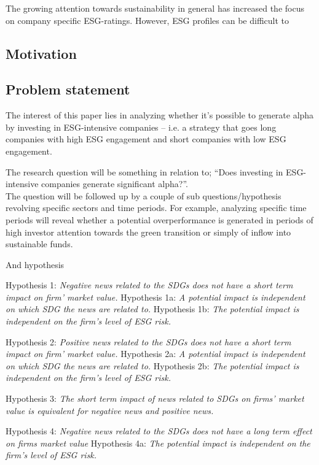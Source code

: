 The growing attention towards sustainability in general has increased the focus on company specific ESG-ratings. However, ESG profiles can be difficult to


\subsection{Motivation}

\subsection{Problem statement}

The interest of this paper lies in analyzing whether it’s possible to generate alpha by investing in ESG-intensive companies – i.e.
a strategy that goes long companies with high ESG engagement and short companies with low ESG engagement. 

The research question will be something in relation to; “Does investing in ESG-intensive companies generate significant alpha?”. \\

The question will be followed up by a couple of sub questions/hypothesis revolving specific sectors and time periods. For example, analyzing specific time periods will reveal whether a potential overperformance is generated in periods of high investor attention towards the green transition or simply of inflow into sustainable funds. 

And hypothesis

Hypothesis 1: \textit{Negative news related to the SDGs does not have a short term impact on firm' market value.
}
Hypothesis 1a: \textit{A potential impact is independent on which SDG the news are related to.}  
Hypothesis 1b: \textit{The potential impact is independent on the firm's level of ESG risk.}

Hypothesis 2: \textit{Positive news related to the SDGs does not have a short term impact on firm' market value.}
Hypothesis 2a: \textit{A potential impact is independent on which SDG the news are related to.}  
Hypothesis 2b: \textit{The potential impact is independent on the firm's level of ESG risk.}

Hypothesis 3: \textit{The short term impact of news related to SDGs on firms' market value is equivalent for negative news and positive news.}

Hypothesis 4: \textit{Negative news related to the SDGs does not have a long term effect on firms market value}
Hypothesis 4a: \textit{The potential impact is independent on the firm's level of ESG risk.}


